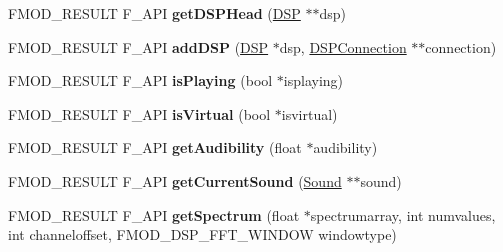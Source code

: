 \begin{DoxyCompactItemize}
\item 
\hypertarget{class_f_m_o_d_1_1_channel_a2629c769ba2de6aec89da5c07bf4a535}{F\-M\-O\-D\-\_\-\-R\-E\-S\-U\-L\-T F\-\_\-\-A\-P\-I {\bfseries get\-D\-S\-P\-Head} (\hyperlink{class_f_m_o_d_1_1_d_s_p}{D\-S\-P} $\ast$$\ast$dsp)}\label{class_f_m_o_d_1_1_channel_a2629c769ba2de6aec89da5c07bf4a535}

\item 
\hypertarget{class_f_m_o_d_1_1_channel_a87b31364ea541df027a5dc89c2d8af2b}{F\-M\-O\-D\-\_\-\-R\-E\-S\-U\-L\-T F\-\_\-\-A\-P\-I {\bfseries add\-D\-S\-P} (\hyperlink{class_f_m_o_d_1_1_d_s_p}{D\-S\-P} $\ast$dsp, \hyperlink{class_f_m_o_d_1_1_d_s_p_connection}{D\-S\-P\-Connection} $\ast$$\ast$connection)}\label{class_f_m_o_d_1_1_channel_a87b31364ea541df027a5dc89c2d8af2b}

\item 
\hypertarget{class_f_m_o_d_1_1_channel_a0e50e17361a0fc354a674827285539fa}{F\-M\-O\-D\-\_\-\-R\-E\-S\-U\-L\-T F\-\_\-\-A\-P\-I {\bfseries is\-Playing} (bool $\ast$isplaying)}\label{class_f_m_o_d_1_1_channel_a0e50e17361a0fc354a674827285539fa}

\item 
\hypertarget{class_f_m_o_d_1_1_channel_aba59130d19b04270bbe8d765d79018f9}{F\-M\-O\-D\-\_\-\-R\-E\-S\-U\-L\-T F\-\_\-\-A\-P\-I {\bfseries is\-Virtual} (bool $\ast$isvirtual)}\label{class_f_m_o_d_1_1_channel_aba59130d19b04270bbe8d765d79018f9}

\item 
\hypertarget{class_f_m_o_d_1_1_channel_a1b3f068e7ad3ba926b647e0d5d186f5a}{F\-M\-O\-D\-\_\-\-R\-E\-S\-U\-L\-T F\-\_\-\-A\-P\-I {\bfseries get\-Audibility} (float $\ast$audibility)}\label{class_f_m_o_d_1_1_channel_a1b3f068e7ad3ba926b647e0d5d186f5a}

\item 
\hypertarget{class_f_m_o_d_1_1_channel_af8c6cb4f1490eda077f4a661437a0809}{F\-M\-O\-D\-\_\-\-R\-E\-S\-U\-L\-T F\-\_\-\-A\-P\-I {\bfseries get\-Current\-Sound} (\hyperlink{class_f_m_o_d_1_1_sound}{Sound} $\ast$$\ast$sound)}\label{class_f_m_o_d_1_1_channel_af8c6cb4f1490eda077f4a661437a0809}

\item 
\hypertarget{class_f_m_o_d_1_1_channel_ae3527fdf12e4b0aa49019a7ca02300e6}{F\-M\-O\-D\-\_\-\-R\-E\-S\-U\-L\-T F\-\_\-\-A\-P\-I {\bfseries get\-Spectrum} (float $\ast$spectrumarray, int numvalues, int channeloffset, F\-M\-O\-D\-\_\-\-D\-S\-P\-\_\-\-F\-F\-T\-\_\-\-W\-I\-N\-D\-O\-W windowtype)}\label{class_f_m_o_d_1_1_channel_ae3527fdf12e4b0aa49019a7ca02300e6}


\end{DoxyCompactItemize}
